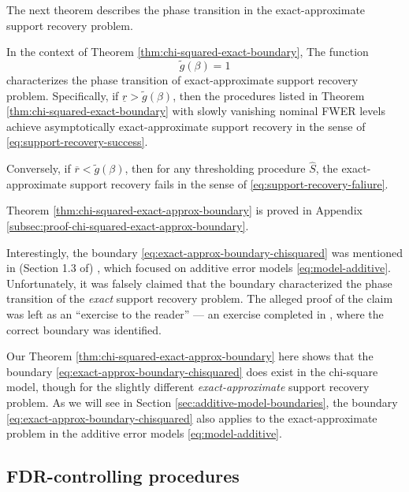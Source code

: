 The next theorem describes the phase transition in the exact-approximate support recovery problem.

\begin{theorem} \label{thm:chi-squared-exact-approx-boundary}
In the context of Theorem \ref{thm:chi-squared-exact-boundary}, 
The function 
\begin{equation} \label{eq:exact-approx-boundary-chisquared}
    \widetilde{g}(\beta) = 1
\end{equation}
characterizes the phase transition of exact-approximate support recovery problem.
Specifically, if $\underline{r} > \widetilde{g}(\beta)$, then the procedures listed in Theorem \ref{thm:chi-squared-exact-boundary} with slowly vanishing nominal FWER levels achieve asymptotically exact-approximate support recovery in the sense of \eqref{eq:support-recovery-success}. 

Conversely, if $\overline{r} < \widetilde{g}(\beta)$, then for any thresholding procedure $\widehat{S}$, the exact-approximate support recovery fails in the sense of \eqref{eq:support-recovery-faliure}.
\end{theorem}

Theorem \ref{thm:chi-squared-exact-approx-boundary} is proved in Appendix \ref{subsec:proof-chi-squared-exact-approx-boundary}. 

\begin{remark}
Interestingly, the boundary  \eqref{eq:exact-approx-boundary-chisquared} was mentioned in (Section 1.3 of) \citet{arias2017distribution}, which focused on additive error models \eqref{eq:model-additive}.
Unfortunately, it was falsely claimed that the boundary characterized the phase transition of the \emph{exact} support recovery problem. 
The alleged proof of the claim was left as an ``exercise to the reader'' --- an exercise completed in \cite{gao2018fundamental}, where the correct boundary was identified. 

Our Theorem \ref{thm:chi-squared-exact-approx-boundary} here shows that the boundary \eqref{eq:exact-approx-boundary-chisquared} does exist in the chi-square model, though for the slightly different \emph{exact-approximate} support recovery problem.
As we will see in Section \ref{sec:additive-model-boundaries}, the boundary \eqref{eq:exact-approx-boundary-chisquared} also applies to the exact-approximate problem in the additive error models \eqref{eq:model-additive}.
\end{remark}


\subsection{FDR-controlling procedures}
\label{subsec:FDR-controlling-procedures}

